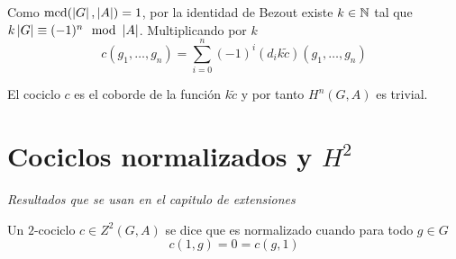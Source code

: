 \begin{teorema}
\begin{demostracion}
		Como $\operatorname{mcd}(\left|G\right|, \left|A\right|) = 1$, por la identidad de Bezout existe $k\in \mathbb{N}$ tal que $k \ord{G} \equiv (-1)^{n} \mod \ord{A}$. Multiplicando por $k$
		\begin{equation*}
			c(g_1,\hdots,g_n) = \sum\limits_{i=0}^n (-1)^i(d_i k\tilde c)(g_1,\ldots,g_n)
		\end{equation*}
		
		El cociclo $c$ es el coborde de la función $k \tilde c$ y por tanto $H^n(G,A)$ es trivial.
		
		
	\end{demostracion}
\end{teorema}

\section{Cociclos normalizados y $H^2$}

 \textit{Resultados que se usan en el capitulo de extensiones}

%

\begin{definicion}%
	Un $2$-cociclo $c\in Z^2(G,A)$ se dice que es normalizado cuando para todo $g\in G$
	\begin{equation*}
		c(1,g)= 0 = c(g,1)
	\end{equation*}
\end{definicion}

